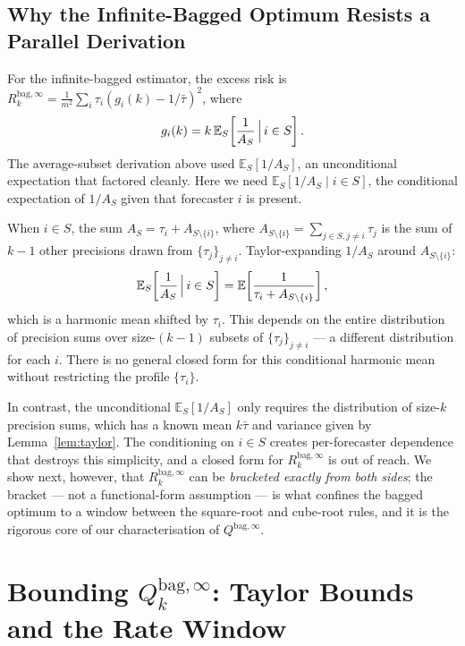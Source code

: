 \documentclass[12pt,a4paper]{article}
\theoremstyle{definition}
\newcommand{\Rk}{R_k^{\mathrm{bag},\infty}}
\newcommand{\E}{\mathbb{E}}
\begin{document}
\subsection{Why the Infinite-Bagged Optimum Resists a Parallel Derivation}
\label{sec:whyhard}

For the infinite-bagged estimator, the excess risk is
$\Rk=\frac{1}{m^2}\sum_i\tau_i(g_i(k)-1/\bar\tau)^2$, where
\begin{equation}
  g_i(k) = k\,\E_S\!\left[\frac{1}{A_S}\,\Bigl|\,i\in S\right].
\end{equation}
The average-subset derivation above used $\E_S[1/A_S]$, an unconditional
expectation that factored cleanly.  Here we need
$\E_S[1/A_S\mid i\in S]$, the conditional expectation of $1/A_S$ given
that forecaster $i$ is present.

When $i\in S$, the sum $A_S=\tau_i+A_{S\setminus\{i\}}$, where
$A_{S\setminus\{i\}}=\sum_{j\in S,j\neq i}\tau_j$ is the sum of $k-1$
other precisions drawn from $\{\tau_j\}_{j\neq i}$.  Taylor-expanding
$1/A_S$ around $A_{S\setminus\{i\}}$:
\begin{equation}
  \E_S\!\left[\frac{1}{A_S}\,\Bigl|\,i\in S\right]
  = \E\!\left[\frac{1}{\tau_i+A_{S\setminus\{i\}}}\right],
\end{equation}
which is a harmonic mean shifted by $\tau_i$.  This depends on the entire
distribution of precision sums over size-$(k-1)$ subsets of
$\{\tau_j\}_{j\neq i}$ — a different distribution for each $i$.  There is
no general closed form for this conditional harmonic mean without
restricting the profile $\{\tau_i\}$.

In contrast, the unconditional $\E_S[1/A_S]$ only requires the distribution
of size-$k$ precision sums, which has a known mean $k\bar\tau$ and variance
given by Lemma~\ref{lem:taylor}.  The conditioning on $i\in S$ creates
per-forecaster dependence that destroys this simplicity, and a closed form
for $\Rk$ is out of reach.  We show next, however, that $\Rk$ can be
\emph{bracketed exactly from both sides}; the bracket — not a functional-form
assumption — is what confines the bagged optimum to a window between the
square-root and cube-root rules, and it is the rigorous core of our
characterisation of $Q^{\mathrm{bag},\infty}$.

\section{Bounding $Q^{\mathrm{bag},\infty}_k$: Taylor Bounds and the Rate Window}
\label{sec:bracket}
\end{document}
